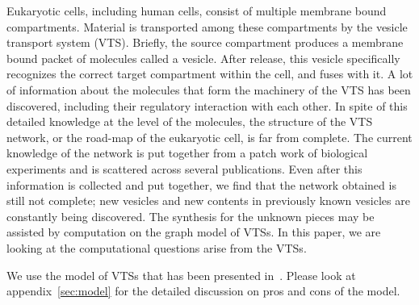 
Eukaryotic cells, including human cells, consist of multiple membrane
bound compartments.
%
Material is transported among these compartments by the vesicle
transport system (VTS).
%
Briefly, the source compartment produces a membrane bound packet of
molecules called a vesicle.
%
After release, this vesicle specifically recognizes the correct target
compartment within the cell, and fuses with it.
%
A lot of information about the molecules that form the machinery of
the VTS has been discovered, including their regulatory interaction
with each other. 
%
In spite of this detailed knowledge at the level of the molecules, the
structure of the VTS network, or the road-map of the eukaryotic cell,
is far from complete.
%
The current knowledge of the network is put together from a patch work
of biological experiments and is scattered across several publications.
%
Even after this information is collected and put together, we find
that the network obtained is still not complete; new vesicles and new
contents in previously known vesicles are constantly being discovered.
%
The synthesis for the unknown pieces may be assisted by computation on
the graph model of VTSs.
%
% 
%
%
%
%
%
In this paper, we are looking at the computational questions 
arise from the VTSs.


We use the model of VTSs that has been presented in~\cite{shukla2017discovering}.
%
Please look at appendix~\ref{sec:model}
for the detailed discussion on pros and cons of the model.


